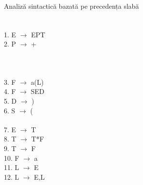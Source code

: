 \documentclass[pdf]{beamer}
\begin{document}
\begin{frame}{Analiză sintactică bazată pe precedența slabă}
\scriptsize
\color{red}{2. Modificarea gramaticii}\\
\ \\
{\color{blue}{+}}{\colorbox{yellow}{ {\color{red}{=<}}}}{\color{blue}{T}}\\
\color{black}
1. E $\rightarrow$ EPT\\
2. P $\rightarrow$ +\\
\ \\
\color{blue}{(}\colorbox{yellow}{ \color{red}{=<}}\color{blue}{E}\\
\color{blue}{E}\colorbox{yellow}{ \color{red}{=<}}\color{blue}{)}\\
\color{black}
3. F $\rightarrow$ a(L)\\
4. F $\rightarrow$ SED\\
5. D $\rightarrow$ )\\
6. S $\rightarrow$ (\\
\ \\
7. E $\rightarrow$ T\\
8. T $\rightarrow$ T*F\\
9. T $\rightarrow$ F\\
10. F $\rightarrow$ a\\
11. L $\rightarrow$ E\\
12. L $\rightarrow$ E,L\\
\end{frame}
\end{document}
